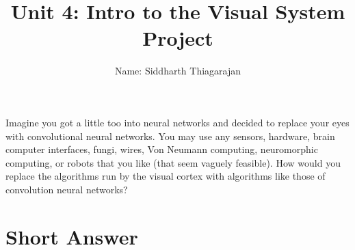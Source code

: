 \documentclass[letterpaper,11pt]{article}
\begin{document}
\title{{\bf Unit 4: Intro to the Visual System Project} }
\author{Name: Siddharth Thiagarajan}

\date{}
\maketitle

Imagine you got a little too into neural networks and decided to replace your eyes with convolutional neural networks. You may use any sensors, hardware, brain computer interfaces, fungi, wires, Von Neumann computing, neuromorphic computing, or robots that you like (that seem vaguely feasible). How would you replace the algorithms run by the visual cortex with algorithms like those of convolution neural networks? 

\section*{Short Answer}
\end{document}
